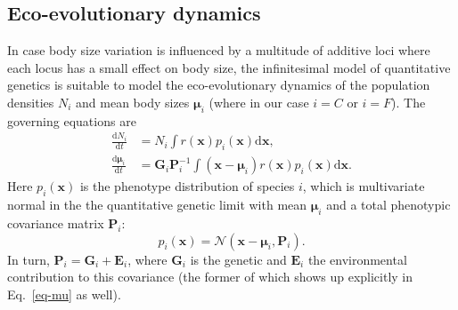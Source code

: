 \documentclass[9pt,twoside,lineno]{pnas-new}
\newcommand{\ud}{\text{d}}
\newcommand{\mat}[1]{\bm{#1}}
\begin{document}
\subsection*{Eco-evolutionary dynamics}

In case body size variation is influenced by a multitude of additive loci where each locus has a small effect on body size, the infinitesimal model of quantitative genetics \citep{Barton2017} is suitable to model the eco-evolutionary dynamics of the population densities $N_i$ and mean body sizes $\mat{\mu}_i$ (where in our case $i = C$ or $i = F$). The governing equations \cite{Barabasetal2022} are
\begin{align}
  \label{eq-N}
  \frac{\ud N_i}{\ud t}
  &= N_i \int r(\mat{x}) p_i(\mat{x}) \ud\mat{x} , \\
  \label{eq-mu}
  \frac{\ud \mat{\mu}_i}{\ud t}
  &= \mat{G}_i\mat{P}_i^{-1}
  \int (\mat{x} - \mat{\mu}_i) r(\mat{x}) p_i(\mat{x}) \ud\mat{x} .
\end{align}
Here $p_i(\mat{x})$ is the phenotype distribution of species $i$, which is multivariate normal in the the quantitative genetic limit with mean $\mat{\mu}_i$ and a total phenotypic covariance matrix $\mat{P}_i$:
\begin{equation}
  \label{eq-normdist}
  p_i(\mat{x})
  = \mathcal{N}(\mat{x} - \mat{\mu}_i, \mat{P}_i) .
\end{equation}
In turn, $\mat{P}_i = \mat{G}_i + \mat{E}_i$, where $\mat{G}_i$ is the genetic and $\mat{E}_i$ the environmental contribution to this covariance (the former of which shows up explicitly in Eq.~\ref{eq-mu} as well).
\end{document}
